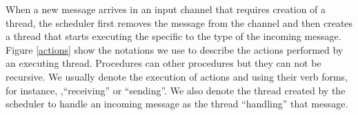 When a new message arrives in an input channel that requires creation of a
thread, the scheduler first removes the message from the channel and then
creates a thread that starts executing the \procedure{} specific to the type of
the incoming message. Figure \ref{actions} show the notations we use to
describe the actions performed by an executing thread. Procedures can \call{}
other procedures but they can not be recursive. We usually denote the execution
of actions \receive{} and \send{} using their verb forms, for instance,
,``receiving'' or ``sending''. We also denote the thread created by the
scheduler to handle an incoming message as the thread ``handling'' that
message.
